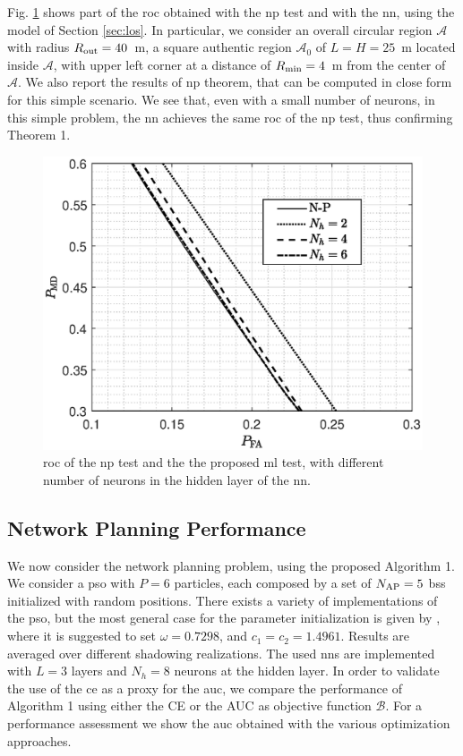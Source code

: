 \documentclass[conference,final]{IEEEtran}
\begin{document}
Fig. \ref{fig:NP_comp} shows part of the \ac{roc} obtained with the \ac{np} test and with the \ac{nn}, using  the model of Section \ref{sec:los}. In particular, we consider an overall circular region $\mathcal{A}$ with radius $R_{\rm out} = 40$~m, a square authentic region $\mathcal{A}_0$ of $L = H= 25$~m located inside $\mathcal{A}$, with upper left corner at a distance of $R_{\rm min} = 4$~m from the center of $\mathcal{A}$. We also report the results of \ac{np} theorem, that can be computed in close form for this simple scenario.  We see that, even with a small number of neurons, in this simple problem, the \ac{nn} achieves the same \ac{roc} of the \ac{np} test, thus confirming  Theorem 1.

 
 \begin{figure}[h]
     \centering
     \includegraphics[width=0.9\columnwidth]{FA_MD_LOS.eps}
     \caption{\ac{roc} of the \ac{np} test and the the proposed \ac{ml} test,  with different number of neurons in the hidden layer of the \ac{nn}.}
     \label{fig:NP_comp}
 \end{figure}


\subsection{Network Planning Performance}

We now consider the network planning problem, using the proposed Algorithm 1. We consider a \ac{pso} with $P=6$ particles, each composed by a set of $N_{\rm AP}=5$ \acp{bs} initialized with random positions. There exists a variety of implementations of the \ac{pso}, but the most general case for the parameter initialization is given by \cite{clerc2002}, where it is suggested to set $\omega=0.7298$, and $c_1=c_2=1.4961$. Results are averaged over different shadowing realizations. The used \acp{nn} are implemented with $L=3$ layers and $N_h=8$ neurons at the hidden layer. In order to validate the use of the \ac{ce} as a proxy for the \ac{auc}, we compare the performance of Algorithm 1 using either the CE or the AUC as objective function  $\mathcal{B}$. For a performance assessment we show  the \ac{auc} obtained with the various optimization approaches.
\end{document}
